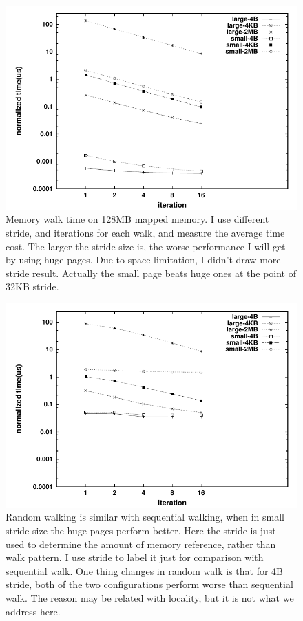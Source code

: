 \begin{figure}[hbt]
\centering
\includegraphics[width=0.9\linewidth]{../figures/hugetlb_128m}
\caption{Memory walk time on 128MB mapped memory. I use different stride, and
iterations for each walk, and measure the average time cost. The larger the 
stride size is, the worse performance I will get by using huge pages. Due to
space limitation, I didn't draw more stride result. Actually the small page
beats huge ones at the point of 32KB stride.}
\label{fig:hugetlb-time}
\end{figure}
\begin{figure}[h]
\includegraphics[width=0.9\linewidth]{../figures/hugetlb_rand_128m}
\caption{Random walking is similar with sequential walking, when in small stride
size the huge pages perform better. Here the stride is just used to determine the 
amount of memory reference, rather than walk pattern. I use stride to label it
just for comparison with sequential walk. One thing changes in random walk is
that for 4B stride, both of the two configurations perform worse than
sequential walk. The reason may be related with locality, but it is not what we
address here.}
\label{fig:hugetlb-rand}
\end{figure}

